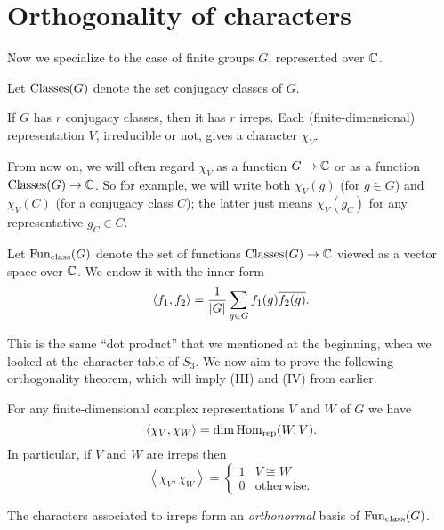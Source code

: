 \section{Orthogonality of characters}
Now we specialize to the case of finite groups $G$, represented over $\mathbb C$.
\begin{definition}
	Let $\operatorname{Classes}(G)$ denote the set conjugacy classes of $G$.
\end{definition}
If $G$ has $r$ conjugacy classes, then it has $r$ irreps.
Each (finite-dimensional) representation $V$, irreducible or not, gives a
character $\chi_V$.
\begin{abuse}
	From now on, we will often regard $\chi_V$ as a function $G \to \mathbb C$
	or as a function $\operatorname{Classes}(G) \to \mathbb C$.
	So for example, we will write both $\chi_V(g)$ (for $g \in G$)
	and $\chi_V(C)$ (for a conjugacy class $C$);
	the latter just means $\chi_V(g_C)$ for any representative $g_C \in C$.
\end{abuse}
\begin{definition}
	Let $\operatorname{Fun}_{\mathrm{class}}(G)$ denote the set of functions $\operatorname{Classes}(G) \to \mathbb C$
	viewed as a vector space over $\mathbb C$.
	We endow it with the inner form
	\[
		\left< f_1, f_2 \right> =
		\frac{1}{|G|}
		\sum_{g \in G} f_1(g) \overline{f_2(g)}.
	\]
\end{definition}
This is the same ``dot product'' that we mentioned at the beginning,
when we looked at the character table of $S_3$.
We now aim to prove the following orthogonality theorem,
which will imply (III) and (IV) from earlier.
\begin{theorem}[Orthogonality]
	For any finite-dimensional complex representations $V$ and $W$
	of $G$ we have
	\[ \left< \chi_V, \chi_W \right> = \dim \operatorname{Hom}_{\mathrm{rep}}(W, V). \]
	In particular, if $V$ and $W$ are irreps then
	\[ \left< \chi_V, \chi_W \right>
		=
		\begin{cases}
			1 & V  \cong W \\
			0 & \text{otherwise}.
		\end{cases}
	\]
\end{theorem}
\begin{corollary}
	The characters associated to irreps
	form an \emph{orthonormal} basis of $\operatorname{Fun}_{\mathrm{class}}(G)$.
\end{corollary}

